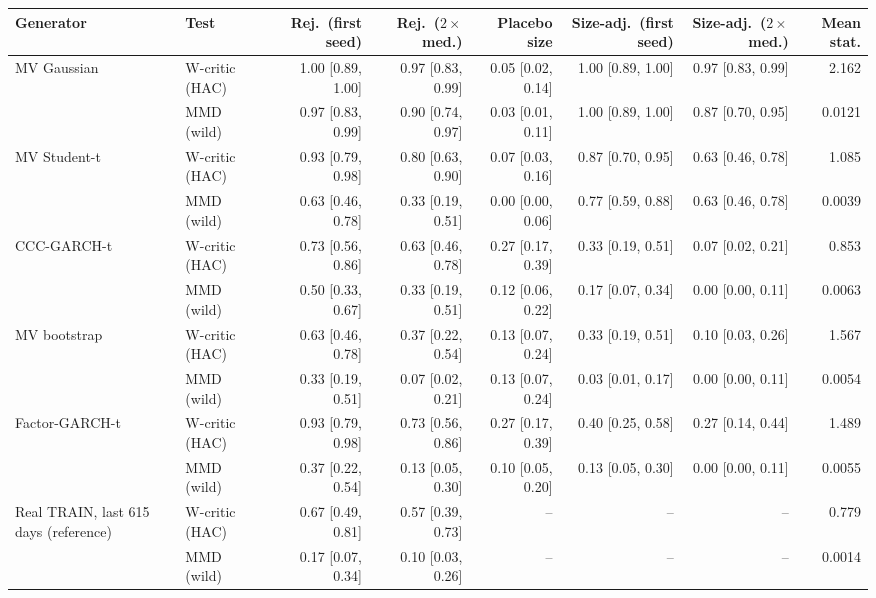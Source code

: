 \begin{tabular}{llrrrrrr}
\toprule
Generator & Test & Rej.\ (first seed) & Rej.\ ($2\times$med.) & Placebo size & Size-adj.\ (first seed) & Size-adj.\ ($2\times$med.) & Mean stat. \\
\midrule
MV Gaussian & W-critic (HAC) & 1.00 [0.89, 1.00] & 0.97 [0.83, 0.99] & 0.05 [0.02, 0.14] & 1.00 [0.89, 1.00] & 0.97 [0.83, 0.99] & 2.162 \\
 & MMD (wild) & 0.97 [0.83, 0.99] & 0.90 [0.74, 0.97] & 0.03 [0.01, 0.11] & 1.00 [0.89, 1.00] & 0.87 [0.70, 0.95] & 0.0121 \\
MV Student-t & W-critic (HAC) & 0.93 [0.79, 0.98] & 0.80 [0.63, 0.90] & 0.07 [0.03, 0.16] & 0.87 [0.70, 0.95] & 0.63 [0.46, 0.78] & 1.085 \\
 & MMD (wild) & 0.63 [0.46, 0.78] & 0.33 [0.19, 0.51] & 0.00 [0.00, 0.06] & 0.77 [0.59, 0.88] & 0.63 [0.46, 0.78] & 0.0039 \\
CCC-GARCH-t & W-critic (HAC) & 0.73 [0.56, 0.86] & 0.63 [0.46, 0.78] & 0.27 [0.17, 0.39] & 0.33 [0.19, 0.51] & 0.07 [0.02, 0.21] & 0.853 \\
 & MMD (wild) & 0.50 [0.33, 0.67] & 0.33 [0.19, 0.51] & 0.12 [0.06, 0.22] & 0.17 [0.07, 0.34] & 0.00 [0.00, 0.11] & 0.0063 \\
MV bootstrap & W-critic (HAC) & 0.63 [0.46, 0.78] & 0.37 [0.22, 0.54] & 0.13 [0.07, 0.24] & 0.33 [0.19, 0.51] & 0.10 [0.03, 0.26] & 1.567 \\
 & MMD (wild) & 0.33 [0.19, 0.51] & 0.07 [0.02, 0.21] & 0.13 [0.07, 0.24] & 0.03 [0.01, 0.17] & 0.00 [0.00, 0.11] & 0.0054 \\
Factor-GARCH-t & W-critic (HAC) & 0.93 [0.79, 0.98] & 0.73 [0.56, 0.86] & 0.27 [0.17, 0.39] & 0.40 [0.25, 0.58] & 0.27 [0.14, 0.44] & 1.489 \\
 & MMD (wild) & 0.37 [0.22, 0.54] & 0.13 [0.05, 0.30] & 0.10 [0.05, 0.20] & 0.13 [0.05, 0.30] & 0.00 [0.00, 0.11] & 0.0055 \\
Real TRAIN, last 615 days (reference) & W-critic (HAC) & 0.67 [0.49, 0.81] & 0.57 [0.39, 0.73] & -- & -- & -- & 0.779 \\
 & MMD (wild) & 0.17 [0.07, 0.34] & 0.10 [0.03, 0.26] & -- & -- & -- & 0.0014 \\
\bottomrule
\end{tabular}
